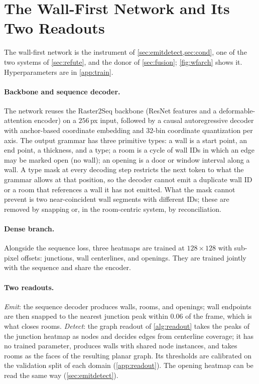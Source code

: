\documentclass{article}
\begin{document}
\section{The Wall-First Network and Its Two Readouts}\label{sec:method}
The wall-first network is the instrument of \cref{sec:emitdetect,sec:cond},
one of the two systems of \cref{sec:refute}, and the donor of
\cref{sec:fusion}; \cref{fig:wfarch} shows it. Hyperparameters are in
\cref{app:train}.

\paragraph{Backbone and sequence decoder.} The network reuses the Raster2Seq
backbone (ResNet features and a deformable-attention encoder) on a $256$\,px
input, followed by a causal autoregressive decoder with anchor-based
coordinate embedding and $32$-bin coordinate quantization per axis. The output
grammar has three primitive types: a wall is a start point, an end point, a
thickness, and a type; a room is a cycle of wall IDs in which an edge may be
marked open (no wall); an opening is a door or window interval along a wall.
A type mask at every decoding step restricts the next token to what the
grammar allows at that position, so the decoder cannot emit a duplicate wall
ID or a room that references a wall it has not emitted. What the mask cannot
prevent is two near-coincident wall segments with different IDs; these are
removed by snapping or, in the room-centric system, by reconciliation.

\paragraph{Dense branch.} Alongside the sequence loss, three heatmaps are
trained at $128\times128$ with sub-pixel offsets: junctions, wall centerlines,
and openings. They are trained jointly with the sequence and share the
encoder.

\paragraph{Two readouts.} \emph{Emit}: the sequence decoder produces walls,
rooms, and openings; wall endpoints are then snapped to the nearest junction
peak within $0.06$ of the frame, which is what closes rooms. \emph{Detect}:
the graph readout of \cref{alg:readout} takes the peaks of the junction
heatmap as nodes and decides edges from centerline coverage; it has no trained
parameter, produces walls with shared node instances, and takes rooms as the
faces of the resulting planar graph. Its thresholds are calibrated on the
validation split of each domain (\cref{app:readout}). The opening heatmap can
be read the same way (\cref{sec:emitdetect}).
\end{document}
